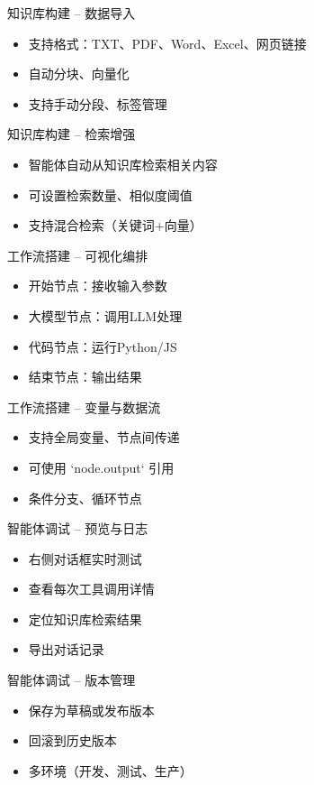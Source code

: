 \begin{frame}{知识库构建 – 数据导入}
\begin{itemize}
    \item 支持格式：TXT、PDF、Word、Excel、网页链接
    \item 自动分块、向量化
    \item 支持手动分段、标签管理
\end{itemize}
\end{frame}
\begin{frame}{知识库构建 – 检索增强}
\begin{itemize}
    \item 智能体自动从知识库检索相关内容
    \item 可设置检索数量、相似度阈值
    \item 支持混合检索（关键词+向量）
\end{itemize}
\end{frame}

\begin{frame}{工作流搭建 – 可视化编排}
\begin{center}
\end{center}
\begin{itemize}
    \item 开始节点：接收输入参数
    \item 大模型节点：调用LLM处理
    \item 代码节点：运行Python/JS
    \item 结束节点：输出结果
\end{itemize}
\end{frame}
\begin{frame}{工作流搭建 – 变量与数据流}
\begin{itemize}
    \item 支持全局变量、节点间传递
    \item 可使用 `{{node.output}}` 引用
    \item 条件分支、循环节点
\end{itemize}
\end{frame}

\begin{frame}{智能体调试 – 预览与日志}
\begin{itemize}
    \item 右侧对话框实时测试
    \item 查看每次工具调用详情
    \item 定位知识库检索结果
    \item 导出对话记录
\end{itemize}
\end{frame}
\begin{frame}{智能体调试 – 版本管理}
\begin{itemize}
    \item 保存为草稿或发布版本
    \item 回滚到历史版本
    \item 多环境（开发、测试、生产）
\end{itemize}
\end{frame}

